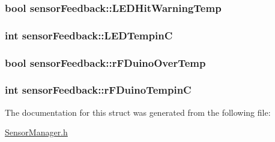 \subsubsection[{\texorpdfstring{L\+E\+D\+Hit\+Warning\+Temp}{LEDHitWarningTemp}}]{\setlength{\rightskip}{0pt plus 5cm}bool sensor\+Feedback\+::\+L\+E\+D\+Hit\+Warning\+Temp}\hypertarget{structsensorFeedback_a26fb822365209c813ad80ee3652f9c97}{}\label{structsensorFeedback_a26fb822365209c813ad80ee3652f9c97}
\subsubsection[{\texorpdfstring{L\+E\+D\+TempinC}{LEDTempinC}}]{\setlength{\rightskip}{0pt plus 5cm}int sensor\+Feedback\+::\+L\+E\+D\+TempinC}\hypertarget{structsensorFeedback_aec838e691afdbba8b383b58ed6bc1d66}{}\label{structsensorFeedback_aec838e691afdbba8b383b58ed6bc1d66}
\subsubsection[{\texorpdfstring{r\+F\+Duino\+Over\+Temp}{rFDuinoOverTemp}}]{\setlength{\rightskip}{0pt plus 5cm}bool sensor\+Feedback\+::r\+F\+Duino\+Over\+Temp}\hypertarget{structsensorFeedback_ad5fc6b5a188a008b8cb38977bc22f94a}{}\label{structsensorFeedback_ad5fc6b5a188a008b8cb38977bc22f94a}
\subsubsection[{\texorpdfstring{r\+F\+Duino\+TempinC}{rFDuinoTempinC}}]{\setlength{\rightskip}{0pt plus 5cm}int sensor\+Feedback\+::r\+F\+Duino\+TempinC}\hypertarget{structsensorFeedback_a53390cf1282c32f034856a70247a1023}{}\label{structsensorFeedback_a53390cf1282c32f034856a70247a1023}


The documentation for this struct was generated from the following file\+:\begin{DoxyCompactItemize}
\item 
\hyperlink{SensorManager_8h}{Sensor\+Manager.\+h}\end{DoxyCompactItemize}
